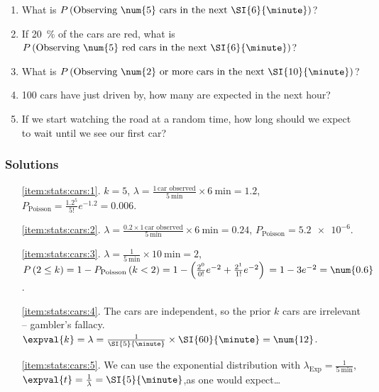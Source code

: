 \begin{enumerate}[noitemsep]
  \item What is $P\left(\text{Observing \num{5} cars in the next \SI{6}{\minute}}\right)$?\label{item:stats:cars:1}
  \item If \SI{20}{\percent} of the cars are red, what is $P\left(\text{Observing \num{5} red cars in the next \SI{6}{\minute}}\right)$?\label{item:stats:cars:2}
  \item What is $P\left(\text{Observing \num{2} or more cars in the next \SI{10}{\minute}}\right)$?\label{item:stats:cars:3}
  \item \num{100} cars have just driven by, how many are expected in the next hour?\label{item:stats:cars:4}
  \item If we start watching the road at a random time, how long should we expect to wait until we see our first car?\label{item:stats:cars:5}
\end{enumerate}

\subsubsection{Solutions}
\label{stats:cars:solutions}

\begin{itemize}[noitemsep]
  \item[\cref{item:stats:cars:1}.] $k = 5$, $\lambda = \frac{1\,\text{car observed}}{\SI{5}{\minute}} \times \SI{6}{\minute} = \num{1.2}$, $P_{\text{Poisson}} = \frac{\num{1.2}^{5}}{5!} e^{-1.2} = \num{0.006}$.
  \item[\cref{item:stats:cars:2}.] $\lambda = \frac{\num{0.2} \times 1\,\text{car observed}}{\SI{5}{\minute}} \times \SI{6}{\minute} = \num{0.24}$, $P_{\text{Poisson}} = \num{5.2e-6}$.
  \item[\cref{item:stats:cars:3}.] $\lambda = \frac{1}{\SI{5}{\minute}} \times \SI{10}{\minute} = \num{2}$, $P\left(2 \leq k \right) = 1 - P_{\text{Poisson}}\left(k < 2 \right) = 1 - \left( \frac{2^{0}}{0!} e^{-2} + \frac{2^{1}}{1!} e^{-2}\right) \newline = 1 - 3 e^{-2} = \num{0.6}$.
  \item[\cref{item:stats:cars:4}.] The cars are independent, so the prior $k$ cars are irrelevant -- gambler's fallacy. $\expval{k} = \lambda = \frac{1}{\SI{5}{\minute}} \times \SI{60}{\minute} = \num{12}$.
  \item[\cref{item:stats:cars:5}.] We can use the exponential distribution with $\lambda_{\text{Exp}} = \frac{1}{\SI{5}{\minute}}$, $\expval{t} = \frac{1}{\lambda} = \SI{5}{\minute}$,\newline as one would expect\ldots
\end{itemize}

